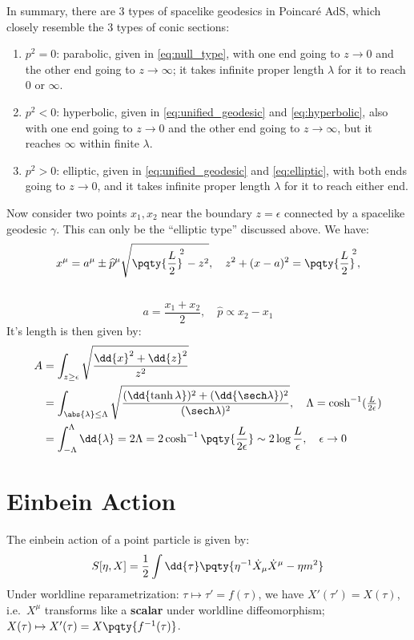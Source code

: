 \documentclass[a4paper,10pt]{article}
\begin{document}
	In summary, there are 3 types of spacelike geodesics in Poincar\'e AdS, which closely resemble the 3 types of conic sections:
	\begin{enumerate}
	\item $p^2 = 0$: parabolic, given in \eqref{eq:null_type}, with one end going to $z\to 0$ and the other end going to $z\to\infty$; it takes infinite proper length $\lambda$ for it to reach $0$ or $\infty$. 
	\item $p^2 < 0$: hyperbolic, given in \eqref{eq:unified_geodesic} and \eqref{eq:hyperbolic}, also with one end going to $z\to 0$ and the other end going to $z\to\infty$, but it reaches $\infty$ within finite $\lambda$. 
	\item $p^2 > 0$: elliptic, given in \eqref{eq:unified_geodesic} and \eqref{eq:elliptic}, with both ends going to $z\to 0$, and it takes infinite proper length $\lambda$ for it to reach either end. 
	\end{enumerate}
	
	Now consider two points $x_1,x_2$ near the boundary $z = \epsilon$ connected by a spacelike geodesic $\gamma$. This can only be the ``elliptic type'' discussed above. We have:
	\begin{equation}
		x^\mu
		= a^\mu \pm \widehat{p}^\mu
			\sqrt{\pqty{\frac{L}{2}}^{\!\!2} - z^2},
	\quad
		z^2 + (x - a)^2
		= \pqty{\frac{L}{2}}^{\!\!2},
	\end{equation}
	\\[-1.5\baselineskip]
	\begin{equation}
		a = \frac{x_1 + x_2}{2},
	\quad
		\widehat{p} \propto x_2 - x_1
	\end{equation}
	It's length is then given by:
	\begin{equation}
	\begin{aligned}
		A
		&= \int_{z\ge\epsilon}
			\sqrt{\frac{\dd{x}^2 + \dd{z}^2}{z^2}} \\
		&= \int_{\abs{\lambda} \le \Lambda} \sqrt{
			\frac{
				(\dd{\tanh\lambda})^2
				+ (\dd{\sech\lambda})^2
			}{(\sech\lambda)^2}
		},
		\quad \Lambda
			= \cosh^{-1} (\tfrac{L}{2\epsilon}) \\
		&= \int_{-\Lambda}^{\Lambda}
			\dd{\lambda}
		= 2\Lambda
		= 2\cosh^{-1} \pqty{\frac{L}{2\epsilon}}
		\sim 2\log \frac{L}{\epsilon},
	\quad \epsilon \to 0
	\end{aligned}
	\end{equation}

\section{Einbein Action}
	The einbein action of a point particle is given by:
	\begin{equation}
		S[\eta,X] = \frac{1}{2} \int \dd{\tau} \pqty{
				\eta^{-1} \dot{X}_\mu \dot{X}^\mu
				- \eta m^2
			}
	\end{equation}
	Under worldline reparametrization: $\tau \mapsto \tau' = f(\tau)$, we have $X'(\tau') = X(\tau)$, i.e.~$X^\mu$ transforms like a \textbf{scalar} under worldline diffeomorphism; $
		X(\tau)
		\mapsto X'(\tau)
		= X\pqty{f^{-1}(\tau)}
	$. 
	
\end{document}
